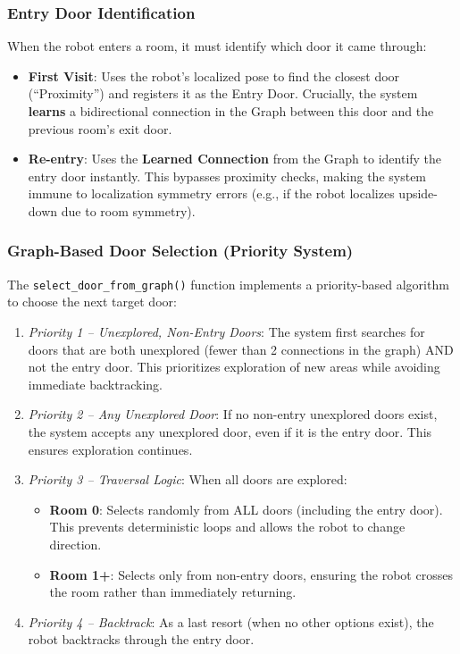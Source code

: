 \documentclass[conference]{IEEEtran}
\begin{document}
    \subsubsection{\textbf{Entry Door Identification}}
    When the robot enters a room, it must identify which door it came through:
    \begin{itemize}
        \item \textbf{First Visit}: Uses the robot's localized pose to find the closest door (``Proximity'') and registers it as the Entry Door. Crucially, the system \textbf{learns} a bidirectional connection in the Graph between this door and the previous room's exit door.
        \item \textbf{Re-entry}: Uses the \textbf{Learned Connection} from the Graph to identify the entry door instantly. This bypasses proximity checks, making the system immune to localization symmetry errors (e.g., if the robot localizes upside-down due to room symmetry).
    \end{itemize}

    \subsubsection{\textbf{Graph-Based Door Selection (Priority System)}}
    The \texttt{select\_door\_from\_graph()} function implements a priority-based algorithm to choose the next target door:

    \begin{enumerate}
        \item \textit{Priority 1 -- Unexplored, Non-Entry Doors}: The system first searches for doors that are both unexplored (fewer than 2 connections in the graph) AND not the entry door. This prioritizes exploration of new areas while avoiding immediate backtracking.
        
        \item \textit{Priority 2 -- Any Unexplored Door}: If no non-entry unexplored doors exist, the system accepts any unexplored door, even if it is the entry door. This ensures exploration continues.
        
        \item \textit{Priority 3 -- Traversal Logic}: When all doors are explored:
        \begin{itemize}
            \item \textbf{Room 0}: Selects randomly from ALL doors (including the entry door). This prevents deterministic loops and allows the robot to change direction.
            \item \textbf{Room 1+}: Selects only from non-entry doors, ensuring the robot crosses the room rather than immediately returning.
        \end{itemize}
        
        \item \textit{Priority 4 -- Backtrack}: As a last resort (when no other options exist), the robot backtracks through the entry door.
    \end{enumerate}
\end{document}
